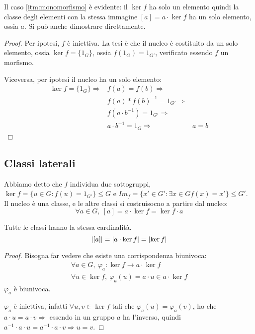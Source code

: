 Il caso \ref{itm:monomorfismo} \`e evidente: il $\ker f$ ha solo un elemento quindi la classe degli elementi con la stessa immagine $[a] = a \cdot \ker f$ ha un solo elemento, ossia $a$. Si pu\`o anche dimostrare direttamente.
\begin{proof}
Per ipotesi, $f$ \`e iniettiva. La tesi \`e che il nucleo \`e costituito da un solo elemento, ossia $\ker f = \{ 1_G \} $, ossia $f(1_G) = 1_{G'}$, verificato essendo $f$ un morfismo.

Viceversa, per ipotesi il nucleo ha un solo elemento:
\begin{align*}
\ker f = \{ 1_G \} \Rightarrow & f(a) = f(b) \Rightarrow & \\
 & f(a) \ast f(b)^{-1} = 1_{G'} \Rightarrow & \\
 & f(a \cdot b^{-1}) = 1_{G'} \Rightarrow & \\ 
 & a \cdot b^{-1} = 1_G \Rightarrow & a = b
\end{align*}
\end{proof}

\subsection{Classi laterali}

Abbiamo detto che $f$ individua due sottogruppi, $\ker f = \{ u \in G : f(u) = 1_{G'} \} \le G$ e $Im_f = \{ x' \in G' : \exists x \in G f(x) = x'\} \le G'$. Il nucleo \`e una classe, e le altre classi si costruisocno a partire dal nucleo:
\[
\forall a \in G , \ [a] = a \cdot \ker f = \ker f \cdot a
\]
\begin{prop}
Tutte le classi hanno la stessa cardinalit\`a.
\[
\left\lvert{[a]}\right\rvert = \left\lvert{a \cdot \ker f}\right\rvert = \left\lvert{\ker f}\right\rvert
\]
\end{prop}
\begin{proof}
Bisogna far vedere che esiste una corrispondenza biunivoca:
\begin{gather*}
\forall a \in G , \ \varphi_a : \ker f \to a \cdot \ker f \\
\forall u \in \ker f , \ \varphi_a (u) = a \cdot u \in a \cdot \ker f
\end{gather*}
$\varphi_a$ \`e biunivoca. 

$\varphi_a$ \`e iniettiva, infatti $\forall u, v \in \ker f $ tali che $\varphi_a (u) = \varphi_a (v)$, ho che $a \cdot u = a \cdot v \Rightarrow$ essendo in un gruppo $a$ ha l'inverso, quindi $a^{-1} \cdot a \cdot u = a^{-1} \cdot a \cdot v \Rightarrow u = v$.
\end{proof}

